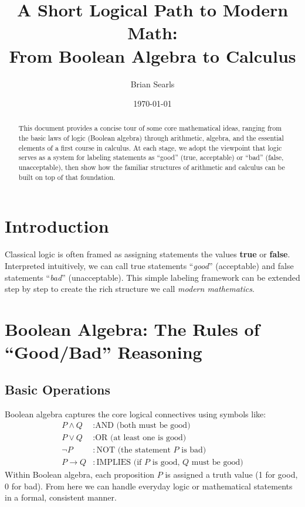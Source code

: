 \documentclass[12pt]{article}
\title{A Short Logical Path to Modern Math:\\
From Boolean Algebra to Calculus}
\author{Brian Searls}
\date{\today}
\begin{document}
\maketitle

\begin{abstract}
This document provides a concise tour of some core mathematical ideas,
ranging from the basic laws of logic (Boolean algebra) through arithmetic,
algebra, and the essential elements of a first course in calculus.
At each stage, we adopt the viewpoint that logic serves as a system for
labeling statements as ``good'' (true, acceptable) or ``bad'' (false,
unacceptable), then show how the familiar structures of arithmetic and
calculus can be built on top of that foundation.
\end{abstract}

\tableofcontents

\section{Introduction}
Classical logic is often framed as assigning statements the values
\textbf{true} or \textbf{false}. Interpreted intuitively, we can call
true statements ``\emph{good}'' (acceptable) and false statements
``\emph{bad}'' (unacceptable). This simple labeling framework can
be extended step by step to create the rich structure we call
\emph{modern mathematics}.

\section{Boolean Algebra: The Rules of ``Good/Bad'' Reasoning}

\subsection{Basic Operations}
\label{sec:boolean-ops}
Boolean algebra captures the core logical connectives using symbols
like:
\[
\begin{aligned}
P \wedge Q &: \text{AND (both must be good)} \\
P \vee Q &: \text{OR (at least one is good)} \\
\lnot P &: \text{NOT (the statement $P$ is bad)} \\
P \to Q &: \text{IMPLIES (if $P$ is good, $Q$ must be good)}
\end{aligned}
\]
Within Boolean algebra, each proposition $P$ is assigned a truth value
(1 for good, 0 for bad). From here we can handle everyday logic or
mathematical statements in a formal, consistent manner.
\end{document}
